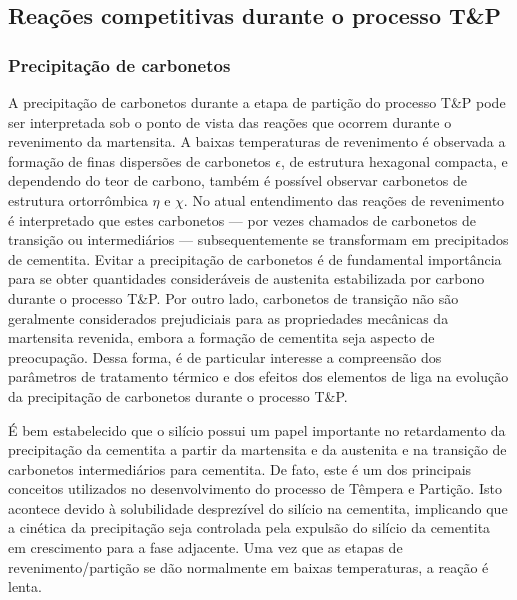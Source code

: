 \subsection{Reações competitivas durante o processo T\&P}

\subsubsection{Precipitação de carbonetos}

A precipitação de carbonetos durante a etapa de partição do processo T\&P pode ser interpretada sob o ponto de vista das reações que ocorrem durante o revenimento da martensita. A baixas temperaturas de revenimento é observada a formação de finas dispersões de carbonetos $\epsilon$, de estrutura hexagonal compacta, e dependendo do teor de carbono, também é possível observar carbonetos de estrutura ortorrômbica $\eta$ e $\chi$. No atual entendimento das reações de revenimento é interpretado que estes carbonetos --- por vezes chamados de carbonetos de transição ou intermediários --- subsequentemente se transformam em precipitados de cementita\cite{Speich1972}. %
Evitar a precipitação de carbonetos é de fundamental importância para se obter quantidades consideráveis de austenita estabilizada por carbono durante o processo T\&P. Por outro lado, carbonetos de transição não são geralmente considerados prejudiciais para as propriedades mecânicas da martensita revenida, embora a formação de cementita seja aspecto de preocupação\cite{Krauss1983}. Dessa forma, é de particular interesse a compreensão dos parâmetros de tratamento térmico e dos efeitos dos elementos de liga na evolução da precipitação de carbonetos durante o processo T\&P. 

É bem estabelecido que o silício possui um papel importante no retardamento da precipitação da cementita a partir da martensita e da austenita e na transição de carbonetos intermediários para cementita. De fato, este é um dos principais conceitos utilizados no desenvolvimento do processo de Têmpera e Partição. Isto acontece devido à solubilidade desprezível do silício na cementita\cite{Owen1951,Barnard1981}, implicando que a cinética da precipitação seja controlada pela expulsão do silício da cementita em crescimento para a fase adjacente. Uma vez que as etapas de revenimento/partição se dão normalmente em baixas temperaturas, a reação é lenta.

